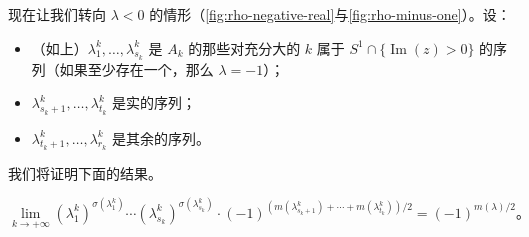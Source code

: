 现在让我们转向 $\lambda<0$ 的情形（\cref{fig:rho-negative-real}与\cref{fig:rho-minus-one}）。设：
\begin{itemize}
\item （如上）$\lambda^k_1,\dotsc,\lambda^k_{s_k}$ 是 $A_k$ 的那些对充分大的 $k$ 属于 $S^1\cap\{\operatorname{Im}(z)>0\}$ 的\trEigenvalue{}序列（如果至少存在一个，那么 $\lambda=-1$）；
\item $\lambda^k_{s_k+1},\dotsc,\lambda^k_{t_k}$ 是实的序列；
\item $\lambda^k_{t_k+1},\dotsc,\lambda^k_{r_k}$ 是其余的序列。
\end{itemize}
我们将证明下面的结果。

\begin{proposition}\label{thm:rho-negative-real}
\[
\lim_{k\to+\infty}(\lambda^k_1)^{\sigma(\lambda^k_1)}\cdots
(\lambda^k_{s_k})^{\sigma(\lambda^k_{s_k})}\cdot
(-1)^{(m(\lambda^k_{s_k+1})+\dotsb+m(\lambda^k_{t_k}))/2}=(-1)^{m(\lambda)/2}\text{。}
\]
\end{proposition}

